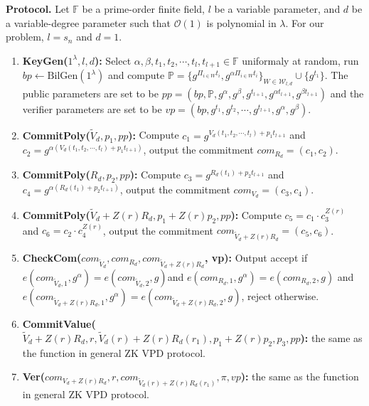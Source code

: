 \medskip\noindent\textbf{Protocol.}
Let $\mathbb{F}$ be a prime-order finite field, $l$ be a variable parameter, and $d$ be a variable-degree parameter such that $\mathcal{O}(1)$ is polynomial in $\lambda$. For our problem, $l = s_n$ and $d = 1$.
\begin{enumerate}
\item \textbf{KeyGen($1^{\lambda}, l, d$):} Select $\alpha, \beta, t_1, t_2, \cdots, t_l, t_{l+1} \in \mathbb{F}$ uniformaly at random, run $bp \leftarrow \text{BilGen}(1^{\lambda})$ and compute $\mathbb{P} = \{g^{\Pi_{i \in W}t_i}, g^{\alpha \Pi_{i \in W}t_i}\}_{W \in \mathcal{W}_{l, d}} \cup \{g^{t_1}\}$. The public parameters are set to be $pp = (bp, \mathbb{P}, g^{\alpha}, g^{\beta}, g^{t_{l+1}}, g^{\alpha t_{l+1}}, g^{\beta t_{l+1}})$ and the verifier parameters are set to be $vp = (bp, g^{t_1}, g^{t_2}, \cdots, g^{t_{l+1}}, g^{\alpha}, g^{\beta})$.

\item \textbf{CommitPoly($\tilde{V}_d, p_1, pp$):} Compute $c_1 = g^{V_d(t_1, t_2, \cdots, t_l) + p_1t_{l+1}}$ and $c_2 = g^{\alpha(V_d(t_1, t_2, \cdots, t_l)+ p_1t_{l+1})}$, output the commitment $com_{R_d} = (c_1, c_2)$.

\item \textbf{CommitPoly($R_d, p_2, pp$):} Compute $c_3 = g^{R_d(t_1) + p_2t_{l+1}}$ and $c_4 = g^{\alpha(R_d(t_1)+ p_2t_{l+1})}$, output the commitment $com_{V_d} = (c_3, c_4)$.

\item \textbf{CommitPoly($\tilde{V}_d + Z(r)R_d, p_1 + Z(r)p_2, pp$):} Compute $c_5 = c_1 \cdot c_3^{Z(r)}$ and $c_6 = c_2 \cdot c_4^{Z(r)}$, output the commitment $com_{\tilde{V}_d + Z(r)R_d} = (c_5, c_6)$.

\item \textbf{CheckCom($com_{\tilde{V}_d}, com_{R_d}, com_{\tilde{V}_d + Z(r)R_d}$, vp):} Output accept if $e(com_{\tilde{V}_d, 1}, g^\alpha) = e(com_{\tilde{V}_d, 2}, g)$and $e(com_{R_d, 1}, g^\alpha) = e(com_{R_d, 2}, g)$ and $e(com_{\tilde{V}_d + Z(r)R_d, 1}, g^\alpha) = e(com_{\tilde{V}_d + Z(r)R_d, 2}, g)$, reject otherwise.

\item \textbf{CommitValue($\tilde{V}_d + Z(r)R_d, r, \tilde{V}_d(r) + Z(r)R_d(r_1), p_1 + Z(r)p_2, p_3, pp$):} the same as the  function in general ZK VPD protocol. 
\item \textbf{Ver($com_{V_d + Z(r)R_d}, r, com_{\tilde{V}_d(r) + Z(r)R_d(r_1)}, \pi, vp$):} the same as the  function in general ZK VPD protocol. 
\end{enumerate} 


